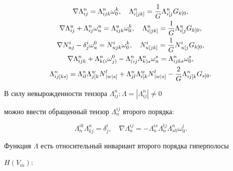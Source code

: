 \begin{gather} 


\nabla\Lambda^n_{ij}=\Lambda^n_{ijk}\omega^k_0,\quad 


\Lambda^n_{i[jk]}=\frac{1}{G}\Lambda{}^n_{i[j}G{}_{k]0},\\ 


% 


\nabla\Lambda^u_{ij}+\Lambda^n_{ij}\omega_n^u=\Lambda^u_{ijk} 


\omega^k_0,\quad \Lambda^u_{i[jk]}=\frac{1}{G} 


\Lambda{}^u_{i[j}G{}_{k]0},\\ 


% 


\nabla N^i_{uj}-\delta^i_j\omega^0_u=N^i_{ujk}\omega^k_0,\quad 


N^i_{u[jk]}=\frac{1}{G}N{}^i_{u[j}G{}_{k]0},\\ 


% 


\nabla\Lambda^n_{ijk}+\Lambda{}^n_{k(i}\omega{}^0_{j)}- 


\Lambda{}^n_{(ij}\Lambda{}^n_{k)s}\omega^s_n= 


\Lambda^n_{ijks}\omega^s_0,\\ 


% 


\Lambda^n_{ij[ks]}=\Lambda^n_{il}\Lambda{}^w_{j[k} 


N{}^l_{|w|s]}+\Lambda^n_{jl}\Lambda{}^w_{i[k} 


N{^l_{|w|s]}}-\frac{2}{G}\Lambda{}^n_{ij[k}G{}_{s]0}.\notag 


\end{gather} 


В силу невырожденности тензора $\Lambda^n_{ij}:\Lambda=|\Lambda^n_{ij}|\ne0$ 


можно ввести обращенный тензор $\Lambda^{ij}_n$ второго порядка: 


\begin{equation} 


\Lambda^{ik}_n\Lambda^n_{kj}=\delta^i_j,\quad 


\nabla\Lambda^{ij}_n=-\Lambda^{is}_n\Lambda^{tj}_n 


\Lambda^n_{stl}\omega^l_0. 


\end{equation} 


Функция $\Lambda$ есть относительный инвариант второго порядка гиперполосы 


$H(V_m)$: 


$$ 



